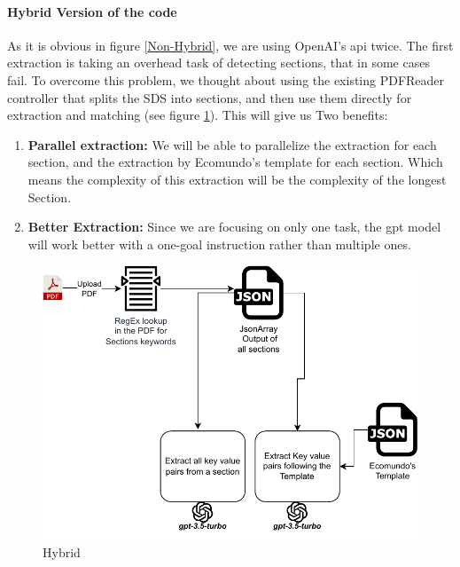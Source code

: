 \documentclass[a4paper,12pt,twoside]{report}
\begin{document}
\paragraph{Hybrid Version of the code}
As it is obvious in figure \ref{Non-Hybrid}, we are using OpenAI's api twice. The first extraction is taking an overhead task of detecting sections, that in some cases fail. To overcome this problem, we thought about using the existing PDFReader controller that splits the SDS into sections, and then use them directly for extraction and matching (see figure \ref{Hybrid}). This will give us Two benefits:
\begin{enumerate}
\item \textbf{Parallel extraction:} We will be able to parallelize the extraction for each section, and the extraction by Ecomundo's template for each section. Which means the complexity of this extraction will be the complexity of the longest Section. 
\item \textbf{Better Extraction:} Since we are focusing on only one task, the gpt model will work better with a one-goal instruction rather than multiple ones.
\end{enumerate}
\begin{figure}
		\includegraphics[width=\textwidth, keepaspectratio ]{images/hybrid}
	\caption[How the Hybrid code works]{Hybrid}
\label{Hybrid}
\end{figure}
\end{document}

